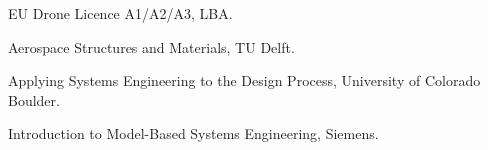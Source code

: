 \begin{cvitems}
  \item EU Drone Licence A1/A2/A3, LBA.
  \item Aerospace Structures and Materials, TU Delft.
  \item Applying Systems Engineering to the Design Process, University of Colorado Boulder.
  \item Introduction to Model-Based Systems Engineering, Siemens.
\end{cvitems}
